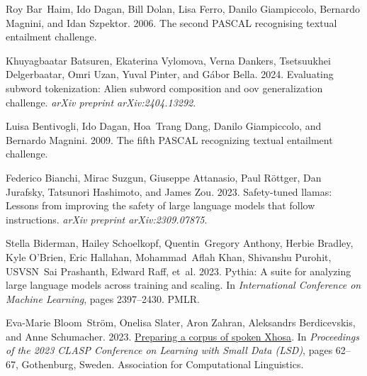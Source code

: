 \documentclass[11pt]{article}
\begin{document}
\begin{thebibliography}{88}
    Roy Bar~Haim, Ido Dagan, Bill Dolan, Lisa Ferro, Danilo Giampiccolo, Bernardo Magnini, and Idan Szpektor. 2006.
    \newblock The second {PASCAL} recognising textual entailment challenge.
    
    Khuyagbaatar Batsuren, Ekaterina Vylomova, Verna Dankers, Tsetsuukhei Delgerbaatar, Omri Uzan, Yuval Pinter, and G{\'a}bor Bella. 2024.
    \newblock Evaluating subword tokenization: Alien subword composition and oov generalization challenge.
    \newblock \emph{arXiv preprint arXiv:2404.13292}.
    
    Luisa Bentivogli, Ido Dagan, Hoa~Trang Dang, Danilo Giampiccolo, and Bernardo Magnini. 2009.
    \newblock The fifth {PASCAL} recognizing textual entailment challenge.
    
    Federico Bianchi, Mirac Suzgun, Giuseppe Attanasio, Paul R{\"o}ttger, Dan Jurafsky, Tatsunori Hashimoto, and James Zou. 2023.
    \newblock Safety-tuned llamas: Lessons from improving the safety of large language models that follow instructions.
    \newblock \emph{arXiv preprint arXiv:2309.07875}.
    
    Stella Biderman, Hailey Schoelkopf, Quentin~Gregory Anthony, Herbie Bradley, Kyle O’Brien, Eric Hallahan, Mohammad~Aflah Khan, Shivanshu Purohit, USVSN~Sai Prashanth, Edward Raff, et~al. 2023.
    \newblock Pythia: A suite for analyzing large language models across training and scaling.
    \newblock In \emph{International Conference on Machine Learning}, pages 2397--2430. PMLR.
    
    Eva-Marie Bloom~Str{\"o}m, Onelisa Slater, Aron Zahran, Aleksandrs Berdicevskis, and Anne Schumacher. 2023.
    \newblock \href {https://aclanthology.org/2023.clasp-1.7} {Preparing a corpus of spoken {X}hosa}.
    \newblock In \emph{Proceedings of the 2023 CLASP Conference on Learning with Small Data (LSD)}, pages 62--67, Gothenburg, Sweden. Association for Computational Linguistics.
    

\end{thebibliography}
\end{document}

